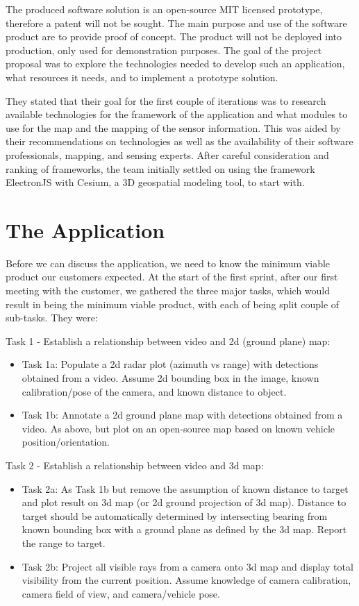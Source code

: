 \documentclass{l3proj}
\begin{document}
The produced software solution is an open-source MIT licensed prototype, therefore a patent will not be sought. The main purpose and use of the software product are to provide proof of concept. The product will not be deployed into production, only used for demonstration purposes. The goal of the project proposal was to explore the technologies needed to develop such an application, what resources it needs, and to implement a prototype solution.

They stated that their goal for the first couple of iterations was to research available technologies for the framework of the application and what modules to use for the map and the mapping of the sensor information. This was aided by their recommendations on technologies as well as the availability of their software professionals, mapping, and sensing experts. After careful consideration and ranking of frameworks, the team initially settled on using the framework ElectronJS with Cesium, a 3D geospatial modeling tool, to start with.

\section{The Application}

Before we can discuss the application, we need to know the minimum viable product our customers expected. At the start of the first sprint, after our first meeting with the customer, we gathered the three major tasks, which would result in being the minimum viable product, with each of being split couple of sub-tasks. They were:

Task 1 - Establish a relationship between video and 2d (ground plane) map:
\begin{itemize}
	\item Task 1a: Populate a 2d radar plot (azimuth vs range) with detections obtained from a video. Assume 2d bounding box in the image, known calibration/pose of the camera, and known distance to object.  
	\item Task 1b: Annotate a 2d ground plane map with detections obtained from a video. As above, but plot on an open-source map based on known vehicle position/orientation. 
\end{itemize}

Task 2 - Establish a relationship between video and 3d map:
\begin{itemize}
	\item Task 2a: As Task 1b but remove the assumption of known distance to target and plot result on 3d map (or 2d ground projection of 3d map). Distance to target should be automatically determined by intersecting bearing from known bounding box with a ground plane as defined by the 3d map. Report the range to target.
	\item Task 2b: Project all visible rays from a camera onto 3d map and display total visibility from the current position. Assume knowledge of camera calibration, camera field of view, and camera/vehicle pose. 
\end{itemize}
\end{document}
